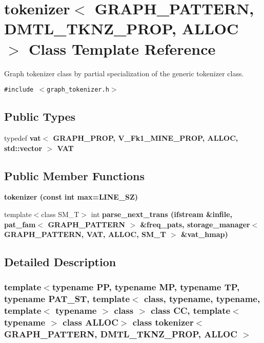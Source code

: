 \section{tokenizer$<$ GRAPH\_\-PATTERN, DMTL\_\-TKNZ\_\-PROP, ALLOC $>$ Class Template Reference}
\label{classtokenizer_3_01GRAPH__PATTERN_00_01DMTL__TKNZ__PROP_00_01ALLOC_01_4}
Graph tokenizer class by partial specialization of the generic tokenizer class.  


{\tt \#include $<$graph\_\-tokenizer.h$>$}

\subsection*{Public Types}
\begin{CompactItemize}
\item 
typedef \bf{vat}$<$ GRAPH\_\-PROP, V\_\-Fk1\_\-MINE\_\-PROP, ALLOC, std::vector $>$ \textbf{VAT}\label{classtokenizer_3_01GRAPH__PATTERN_00_01DMTL__TKNZ__PROP_00_01ALLOC_01_4_56e6ff0ab0e2c59c8a38225350199449}

\end{CompactItemize}
\subsection*{Public Member Functions}
\begin{CompactItemize}
\item 
\bf{tokenizer} (const int max=LINE\_\-SZ)
\item 
template$<$class SM\_\-T$>$ int \bf{parse\_\-next\_\-trans} (ifstream \&infile, \bf{pat\_\-fam}$<$ GRAPH\_\-PATTERN $>$ \&freq\_\-pats, \bf{storage\_\-manager}$<$ GRAPH\_\-PATTERN, \bf{VAT}, ALLOC, SM\_\-T $>$ \&vat\_\-hmap)
\end{CompactItemize}


\subsection{Detailed Description}
\subsubsection*{template$<$typename PP, typename MP, typename TP, typename PAT\_\-ST, template$<$ class, typename, typename, template$<$ typename $>$ class $>$ class CC, template$<$ typename $>$ class ALLOC$>$ class tokenizer$<$ GRAPH\_\-PATTERN, DMTL\_\-TKNZ\_\-PROP, ALLOC $>$}

